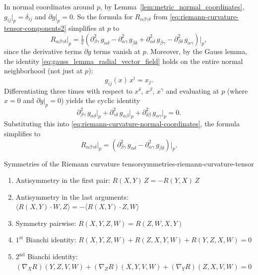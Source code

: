 \begin{colremark}{}{}
In normal coordinates around $p$, by Lemma~\ref{lem:metric_normal_coordinates}, $g_{ij}|_p = \delta_{ij}$ and $\partial g|_p = 0$. So the formula for $R_{\alpha\beta\gamma\delta}$ from \eqref{eq:riemann-curvature-tensor-components2} simplifies at $p$ to
\begin{equation}
    \label{eq:riemann-curvature-normal-coordinates}
    R_{\alpha\beta\gamma\delta}\big|_p = \tfrac{1}{2}\!\left(\partial^2_{\beta\gamma}\,g_{\alpha\delta} - \partial^2_{\alpha\gamma}\,g_{\beta\delta} + \partial^2_{\alpha\delta}\,g_{\beta\gamma} - \partial^2_{\beta\delta}\,g_{\alpha\gamma}\right)\bigg|_p,
\end{equation}
since the derivative terms $\partial g$ terms vanish at $p$. Moreover, by the Gauss lemma, the identity \eqref{eq:gauss_lemma_radial_vector_field} holds on the entire normal neighborhood (not just at $p$):
\[
g_{ij}(x)\,x^i = x_j.
\]
Differentiating three times with respect to $x^\delta$, $x^\beta$, $x^\gamma$ and evaluating at $p$ (where $x = 0$ and $\partial g|_p = 0$) yields the cyclic identity
\[
\partial^2_{\beta\gamma}\,g_{\alpha\delta}\big|_p + \partial^2_{\gamma\delta}\,g_{\alpha\beta}\big|_p + \partial^2_{\delta\beta}\,g_{\alpha\gamma}\big|_p = 0.
\]
Substituting this into \eqref{eq:riemann-curvature-normal-coordinates}, the formula simplifies to
\[
R_{\alpha\beta\gamma\delta}\big|_p = \left(\partial^2_{\beta\gamma}\,g_{\alpha\delta} - \partial^2_{\alpha\gamma}\,g_{\beta\delta}\right)\big|_p.
\]
\end{colremark}



\begin{colortheo}{Symmetries of the Riemann curvature tensor}{symmetries-riemann-curvature-tensor}
\begin{enumerate}
\item Antisymmetry in the first pair: $R(X,Y)\,Z = -R(Y,X)\,Z$
\item Antisymmetry in the last arguments: $\langle R(X,Y)\cdot W, Z \rangle = -\langle R(X,Y)\cdot Z, W \rangle$
\item Symmetry pairwise: ${R}(X,Y,Z,W) = {R}(Z,W,X,Y)$
\item $1^\text{st}$ Bianchi identity: $R(X,Y,Z,W) + R(Z,X,Y,W) + R(Y,Z,X,W) = 0$
\item $2^\text{nd}$ Bianchi identity: $(\nabla_X R)(Y,Z,V,W) + (\nabla_Z R)(X,Y,V,W) + (\nabla_Y R)(Z,X,V,W) = 0$
\end{enumerate}
\end{colortheo}

